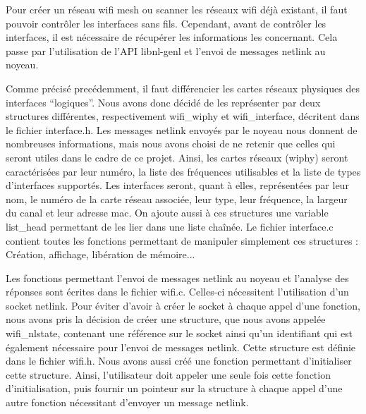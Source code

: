 Pour créer un réseau wifi mesh ou scanner les réseaux wifi déjà existant, il faut pouvoir contrôler les interfaces sans fils. 
Cependant, avant de contrôler les interfaces, il est nécessaire de récupérer les informations les concernant. Cela passe par 
l'utilisation de l'API libnl-genl et l'envoi de messages netlink au noyeau.

Comme précisé precédemment, il faut différencier les cartes réseaux physiques des interfaces ``logiques''. Nous avons donc décidé de 
les représenter par deux structures différentes, respectivement wifi\_\-wiphy et wifi\_\-interface, décritent dans le fichier interface.h. 
Les messages netlink envoyés par le noyeau nous donnent de nombreuses informations, mais nous avons choisi de ne retenir que celles
qui seront utiles dans le cadre de ce projet. Ainsi, les cartes réseaux (wiphy) seront caractérisées par leur numéro, la liste des
fréquences utilisables et la liste de types d'interfaces supportés. Les interfaces seront, quant à elles, représentées par leur nom,
le numéro de la carte réseau associée, leur type, leur fréquence, la largeur du canal et leur adresse mac. On ajoute aussi à ces 
structures une variable list\_\-head permettant de les lier dans une liste chaînée. Le fichier interface.c contient toutes les fonctions 
permettant de manipuler simplement ces structures : Création, affichage, libération de mémoire...

Les fonctions permettant l'envoi de messages netlink au noyeau et l'analyse des réponses sont écrites dans le fichier wifi.c. Celles-ci
nécessitent l'utilisation d'un socket netlink. Pour éviter d'avoir à créer le socket à chaque appel d'une fonction, nous avons pris la
décision de créer une structure, que nous avons appelée wifi\_\-nlstate, contenant une référence sur le socket ainsi qu'un identifiant
qui est également nécessaire pour l'envoi de messages netlink. Cette structure est définie dans le fichier wifi.h. Nous avons aussi
créé une fonction permettant d'initialiser cette structure. Ainsi, l'utilisateur doit  appeler une seule fois cette fonction 
d'initialisation, puis fournir un pointeur sur la structure à chaque appel d'une autre fonction nécessitant d'envoyer un message
netlink.

